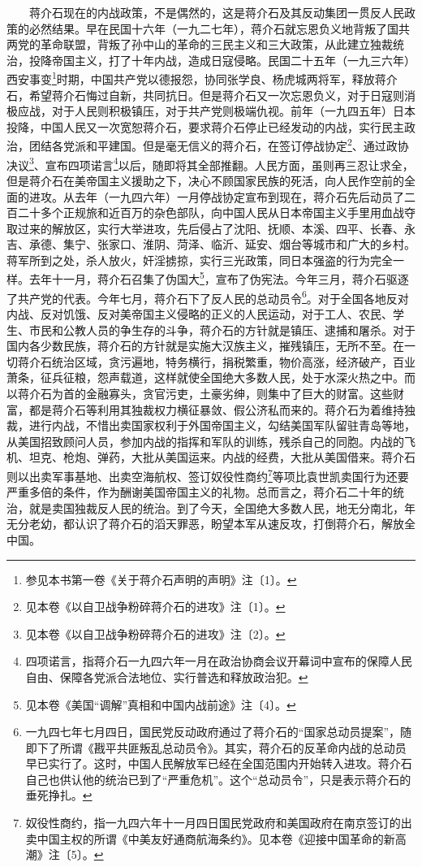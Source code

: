 \documentclass[cn,11pt,chinese]{elegantbook}
\begin{document}
　　蒋介石现在的内战政策，不是偶然的，这是蒋介石及其反动集团一贯反人民政策的必然结果。早在民国十六年（一九二七年），蒋介石就忘恩负义地背叛了国共两党的革命联盟，背叛了孙中山的革命的三民主义和三大政策，从此建立独裁统治，投降帝国主义，打了十年内战，造成日寇侵略。民国二十五年（一九三六年）西安事变\footnote[1]{ 参见本书第一卷《关于蒋介石声明的声明》注〔1〕。}时期，中国共产党以德报怨，协同张学良、杨虎城两将军，释放蒋介石，希望蒋介石悔过自新，共同抗日。但是蒋介石又一次忘恩负义，对于日寇则消极应战，对于人民则积极镇压，对于共产党则极端仇视。前年（一九四五年）日本投降，中国人民又一次宽恕蒋介石，要求蒋介石停止已经发动的内战，实行民主政治，团结各党派和平建国。但是毫无信义的蒋介石，在签订停战协定\footnote[2]{ 见本卷《以自卫战争粉碎蒋介石的进攻》注〔1〕。}、通过政协决议\footnote[3]{ 见本卷《以自卫战争粉碎蒋介石的进攻》注〔2〕。}、宣布四项诺言\footnote[4]{ 四项诺言，指蒋介石一九四六年一月在政治协商会议开幕词中宣布的保障人民自由、保障各党派合法地位、实行普选和释放政治犯。}以后，随即将其全部推翻。人民方面，虽则再三忍让求全，但是蒋介石在美帝国主义援助之下，决心不顾国家民族的死活，向人民作空前的全面的进攻。从去年（一九四六年）一月停战协定宣布到现在，蒋介石先后动员了二百二十多个正规旅和近百万的杂色部队，向中国人民从日本帝国主义手里用血战夺取过来的解放区，实行大举进攻，先后侵占了沈阳、抚顺、本溪、四平、长春、永吉、承德、集宁、张家口、淮阴、菏泽、临沂、延安、烟台等城市和广大的乡村。蒋军所到之处，杀人放火，奸淫掳掠，实行三光政策，同日本强盗的行为完全一样。去年十一月，蒋介石召集了伪国大\footnote[5]{ 见本卷《美国“调解”真相和中国内战前途》注〔4〕。}，宣布了伪宪法。今年三月，蒋介石驱逐了共产党的代表。今年七月，蒋介石下了反人民的总动员令\footnote[6]{ 一九四七年七月四日，国民党反动政府通过了蒋介石的“国家总动员提案”，随即下了所谓《戡平共匪叛乱总动员令》。其实，蒋介石的反革命内战的总动员早已实行了。这时，中国人民解放军已经在全国范围内开始转入进攻。蒋介石自己也供认他的统治已到了“严重危机”。这个“总动员令”，只是表示蒋介石的垂死挣扎。}。对于全国各地反对内战、反对饥饿、反对美帝国主义侵略的正义的人民运动，对于工人、农民、学生、市民和公教人员的争生存的斗争，蒋介石的方针就是镇压、逮捕和屠杀。对于国内各少数民族，蒋介石的方针就是实施大汉族主义，摧残镇压，无所不至。在一切蒋介石统治区域，贪污遍地，特务横行，捐税繁重，物价高涨，经济破产，百业萧条，征兵征粮，怨声载道，这样就使全国绝大多数人民，处于水深火热之中。而以蒋介石为首的金融寡头，贪官污吏，土豪劣绅，则集中了巨大的财富。这些财富，都是蒋介石等利用其独裁权力横征暴敛、假公济私而来的。蒋介石为着维持独裁，进行内战，不惜出卖国家权利于外国帝国主义，勾结美国军队留驻青岛等地，从美国招致顾问人员，参加内战的指挥和军队的训练，残杀自己的同胞。内战的飞机、坦克、枪炮、弹药，大批从美国运来。内战的经费，大批从美国借来。蒋介石则以出卖军事基地、出卖空海航权、签订奴役性商约\footnote[7]{ 奴役性商约，指一九四六年十一月四日国民党政府和美国政府在南京签订的出卖中国主权的所谓《中美友好通商航海条约》。见本卷《迎接中国革命的新高潮》注〔5〕。}等项比袁世凯卖国行为还要严重多倍的条件，作为酬谢美国帝国主义的礼物。总而言之，蒋介石二十年的统治，就是卖国独裁反人民的统治。到了今天，全国绝大多数人民，地无分南北，年无分老幼，都认识了蒋介石的滔天罪恶，盼望本军从速反攻，打倒蒋介石，解放全中国。\\
\end{document}
